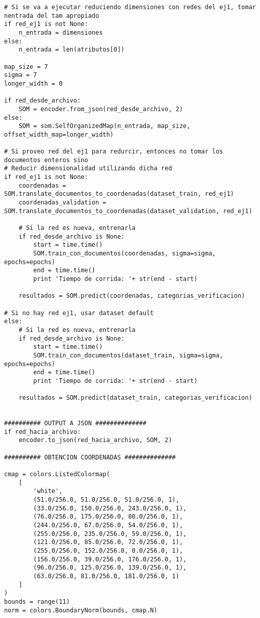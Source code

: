 \begin{changemargin}{-2.0cm}{-1.5cm}
\begin{verbatim}
# Si se va a ejecutar reduciendo dimensiones con redes del ej1, tomar nentrada del tam apropiado
if red_ej1 is not None:
    n_entrada = dimensiones
else:
    n_entrada = len(atributos[0])

map_size = 7
sigma = 7
longer_width = 0

if red_desde_archivo:
    SOM = encoder.from_json(red_desde_archivo, 2)
else:
    SOM = som.SelfOrganizedMap(n_entrada, map_size, offset_width_map=longer_width)

# Si proveo red del ej1 para redurcir, entonces no tomar los documentos enteros sino
# Reducir dimensionalidad utilizando dicha red
if red_ej1 is not None:
    coordenadas = SOM.translate_documentos_to_coordenadas(dataset_train, red_ej1)
    coordenadas_validation = SOM.translate_documentos_to_coordenadas(dataset_validation, red_ej1)

    # Si la red es nueva, entrenarla
    if red_desde_archivo is None:
        start = time.time()
        SOM.train_con_documentos(coordenadas, sigma=sigma, epochs=epochs)
        end = time.time()
        print 'Tiempo de corrida: '+ str(end - start)

    resultados = SOM.predict(coordenadas, categorias_verificacion)

# Si no hay red ej1, usar dataset default
else:
    # Si la red es nueva, entrenarla
    if red_desde_archivo is None:
        start = time.time()
        SOM.train_con_documentos(dataset_train, sigma=sigma, epochs=epochs)
        end = time.time()
        print 'Tiempo de corrida: '+ str(end - start)

    resultados = SOM.predict(dataset_train, categorias_verificacion)


########## OUTPUT A JSON ##############
if red_hacia_archivo:
    encoder.to_json(red_hacia_archivo, SOM, 2)

########## OBTENCION COORDENADAS ##############

cmap = colors.ListedColormap(
    [
        'white', 
        (51.0/256.0, 51.0/256.0, 51.0/256.0, 1), 
        (33.0/256.0, 150.0/256.0, 243.0/256.0, 1),
        (76.0/256.0, 175.0/256.0, 80.0/256.0, 1),
        (244.0/256.0, 67.0/256.0, 54.0/256.0, 1),
        (255.0/256.0, 235.0/256.0, 59.0/256.0, 1),
        (121.0/256.0, 85.0/256.0, 72.0/256.0, 1),
        (255.0/256.0, 152.0/256.0, 0.0/256.0, 1),
        (156.0/256.0, 39.0/256.0, 176.0/256.0, 1),
        (96.0/256.0, 125.0/256.0, 139.0/256.0, 1),
        (63.0/256.0, 81.0/256.0, 181.0/256.0, 1)
    ]
)
bounds = range(11)
norm = colors.BoundaryNorm(bounds, cmap.N)


\end{verbatim}
\end{changemargin}
